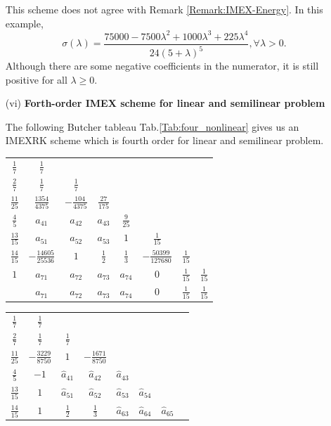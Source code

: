 \documentclass[a4paper, oneside]{book}
\def\hata{{\hat{a}}}
\begin{document}
\begin{itemize}
This scheme does not agree with Remark \ref{Remark:IMEX-Energy}. 
 In this example,
 $$\sigma(\lambda) = \frac{75000-7500 \lambda^2 +1000\lambda^3 +225 \lambda^4}
 {24(5+\lambda)^5}, \forall \lambda > 0.$$
Although there are some negative coefficients in the numerator, it is still positive for all $\lambda \geq 0$.

\item[(vi)] {\bf Forth-order IMEX scheme for linear and semilinear problem}

 The following Butcher tableau Tab.\ref{Tab:four_nonlinear} gives us an IMEXRK scheme 
 which is fourth order for linear and semilinear problem.
 \linespread{1.5}
 \begin{table}[h] \label{Tab:IMEX47}
     \centering
     \begin{tabular}[h]{c|ccccccc}
         $\frac{1}{7}$ & $\frac{1}{7}$ \\
         $\frac{2}{7}$ & $\frac{1}{7}$&$\frac{1}{7}$\\
         $\frac{11}{25}$ & $\frac{1354}{4375}$&$-\frac{104}{4375}$&$\frac{27}{175}$\\
         $\frac{4}{5}$ & $a_{41}$&$a_{42}$&$a_{43}$&$\frac{9}{25}$\\
         $\frac{13}{15}$ & $a_{51}$&$a_{52}$&$a_{53}$&$1$& $\frac{1}{15}$\\
         $\frac{14}{15}$ & $-\frac{14605}{25536}$&$1$&$\frac{1}{2}$&$\frac{1}{3}$&$-\frac{50399}{127680}$&$\frac{1}{15}$\\
         $1$&$a_{71}$&$a_{72}$&$a_{73}$&$a_{74}$&$0$& $\frac{1}{15}$& $\frac{1}{15}$\\
\hline
        ~&$a_{71}$&$a_{72}$&$a_{73}$&$a_{74}$&$0$& $\frac{1}{15}$& $\frac{1}{15}$\\
     \end{tabular}
     \begin{tabular}[h]{c|ccccccc}
        $\frac{1}{7}$ & $\frac{1}{7}$ \\
        $\frac{2}{7}$ & $\frac{1}{7}$&$\frac{1}{7}$\\
        $\frac{11}{25}$ & $-\frac{3229}{8750}$&$1$&$-\frac{1671}{8750}$\\
        $\frac{4}{5}$  & $-1$ & $\hata_{41}$&$\hata_{42}$&$\hata_{43}$\\
        $\frac{13}{15}$ & $1$ & $\hata_{51}$&$\hata_{52}$&$\hata_{53}$&$\hata_{54}$\\
        $\frac{14}{15}$ & $1$ & $\frac12$&$\frac13$&$\hata_{63}$&$\hata_{64}$&$\hata_{65}$\\

\end{tabular}
\end{table}
\end{itemize}
\end{document}
